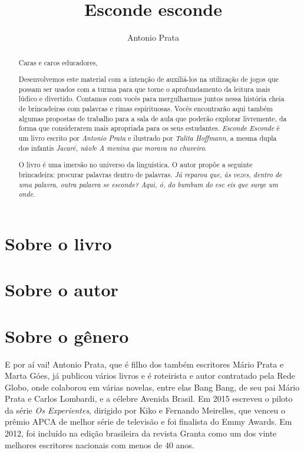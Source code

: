 \documentclass[11pt]{extarticle}
\newcommand{\AutorLivro}{Antonio Prata}
\newcommand{\TituloLivro}{Esconde esconde}
\newcommand{\colaborador}{Gabriela Karam}
\begin{document}
\title{\TituloLivro}
\author{\AutorLivro}
\def\authornotes{\colaborador}

\date{}
\maketitle


\tableofcontents


\begin{abstract}

Caras e caros educadores,

Desenvolvemos este material com a intenção de auxiliá-los na utilização de jogos que possam ser usados com a turma para que torne o aprofundamento da leitura mais lúdico e divertido. Contamos com vocês para mergulharmos juntos nessa história cheia de brincadeiras com palavras e rimas espirituosas. Vocês encontrarão aqui também algumas propostas de trabalho para a sala de aula que poderão explorar livremente, da forma que considerarem mais apropriada para os seus estudantes. \textit{Esconde Esconde} é um livro escrito por \textit{Antonio Prata} e ilustrado por \textit{Talita Hoffmann}, a mesma dupla dos infantis \textit{Jacaré, não!}e \textit{A menina que morava no chuveiro}. 


O livro é uma imersão no universo da linguística. O autor propõe a seguinte brincadeira: procurar palavras dentro de palavras.
\textit{Já reparou que, às vezes, dentro de uma palavra, outra palavra se esconde? Aqui, ó, do bumbum do esc eis que surge um onde.}


\end{abstract}


 \section{Sobre o livro}
 \section{Sobre o autor}
 \section{Sobre o gênero}

E por aí vai! Antonio Prata, que é  filho dos também escritores Mário Prata e Marta Góes, já publicou vários livros e é roteirista e autor contratado pela Rede Globo, onde colaborou em várias novelas, entre elas Bang Bang, de seu pai Mário Prata e Carlos Lombardi, e a célebre Avenida Brasil. Em 2015 escreveu o piloto da série \textit{Os Experientes}, dirigido por Kiko e Fernando Meirelles, que venceu o prêmio APCA de melhor série de televisão e foi finalista do Emmy Awards. Em 2012, foi incluído na edição brasileira da revista Granta como um dos vinte melhores escritores nacionais com menos de 40 anos.
\end{document}
